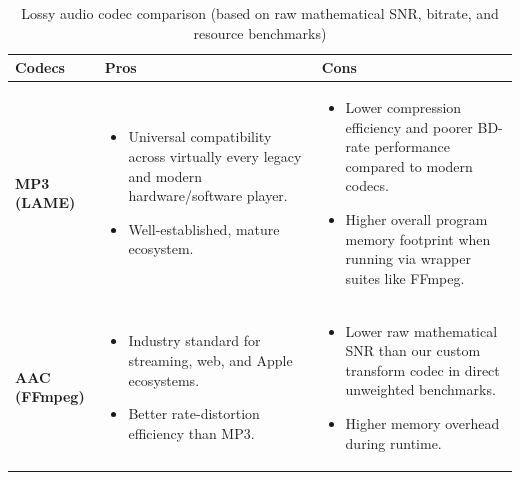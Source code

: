 \begin{table}[htbp]
    \centering
    \caption{Lossy audio codec comparison (based on raw mathematical SNR, bitrate, and resource benchmarks)}
    \label{tab:lossy-codecs}

    \renewcommand{\arraystretch}{1.3}
    \setlength{\tabcolsep}{6pt}

    \begin{tabularx}{\textwidth}{
        @{}
        >{\raggedright\arraybackslash}p{}
        >{\raggedright\arraybackslash}X
        >{\raggedright\arraybackslash}X
        @{}
    }
        \toprule
        \textbf{Codecs} & \textbf{Pros} & \textbf{Cons} \\
        \midrule

        \textbf{MP3 (LAME)}
        &
        \begin{itemize}[leftmargin=*, nosep]
            \item Universal compatibility across virtually every legacy and modern hardware/software player.
            \item Well-established, mature ecosystem.
        \end{itemize}
        &
        \begin{itemize}[leftmargin=*, nosep]
            \item Lower compression efficiency and poorer BD-rate performance compared to modern codecs.
            \item Higher overall program memory footprint when running via wrapper suites like FFmpeg.
        \end{itemize}
        \\

        \addlinespace
        \midrule

        \textbf{AAC (FFmpeg)}
        &
        \begin{itemize}[leftmargin=*, nosep]
            \item Industry standard for streaming, web, and Apple ecosystems.
            \item Better rate-distortion efficiency than MP3.
        \end{itemize}
        &
        \begin{itemize}[leftmargin=*, nosep]
            \item Lower raw mathematical SNR than our custom transform codec in direct unweighted benchmarks.
            \item Higher memory overhead during runtime.
        \end{itemize}
        \\


\end{tabularx}
\end{table}
